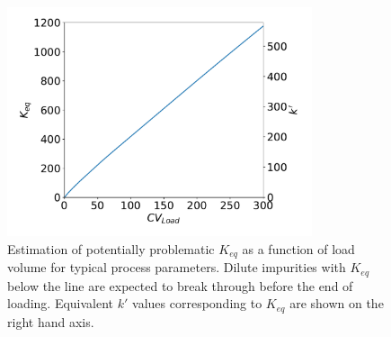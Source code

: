 \documentclass[11pt,a4paper]{article}
\begin{document}
\begin{figure}[bp]
    \centering
    \includegraphics[width=0.8\textwidth]{figure_4}
    \caption{Estimation of potentially problematic $K_{eq}$ as a function of load volume for typical process parameters. Dilute impurities with $K_{eq}$ below the line are expected to break through before the end of loading. Equivalent $k'$ values corresponding to $K_{eq}$ are shown on the right hand axis.}
    \label{fig:problematic Keq}
\end{figure}
\end{document}
